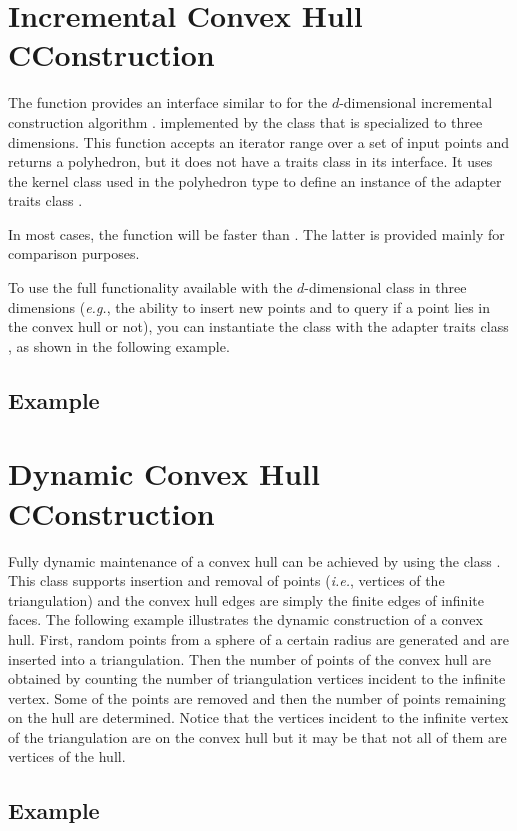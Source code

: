 

\section{Incremental  Convex Hull CConstruction}

The function  %
 provides an
interface similar to  for the $d$-dimensional 
incremental construction algorithm \cite{cms:fourresults-93}.  
implemented by the class  that is specialized 
to three dimensions. This function accepts an iterator range over a set of
input points and returns a polyhedron, but it does not have a traits class
in its interface.  It uses the kernel
class  used in the polyhedron type to define an instance of the 
adapter traits class .

In most cases, the function  will be faster than
.  The latter is provided mainly 
for comparison purposes. 

To use the full functionality available with the $d$-dimensional class 
 in three dimensions (\textit{e.g.}, the ability
to insert new points and to query if a point lies in the convex hull or not), 
you can instantiate the class  with the adapter
traits class , as shown in the following
example.

\subsection{Example}


\section{Dynamic  Convex Hull CConstruction}

Fully dynamic maintenance of a convex hull can be achieved by using the
class .  This class supports insertion
and removal of points (\textit{i.e.}, vertices of the triangulation) and the 
convex hull edges are simply the finite edges of infinite faces.  
The following example illustrates the dynamic construction of a convex hull.
First, random points from a sphere of a certain radius are generated and are
inserted into a triangulation.  Then the number of points of the convex hull 
are obtained by counting the number of triangulation vertices incident to the 
infinite vertex.  Some of the points are removed and then the number of points 
remaining on the hull are determined.  Notice that the vertices incident to the
infinite vertex of the triangulation are on the convex hull but it may be that
not all of them are vertices of the hull.

\subsection{Example}


